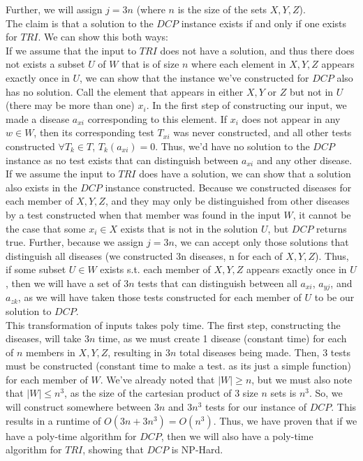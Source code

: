 \documentclass[letterpaper,notitlepage,twoside]{article}
\begin{document}
Further, we will assign $j=3n$ (where $n$ is the size of the sets $X, Y, Z$). \\
The claim is that a solution to the $DCP$ instance exists if and only if one exists for $TRI$. We can show this both ways: \\
If we assume that the input to $TRI$ does not have a solution, and thus there does not exists a subset $U$ of $W$ that is of size $n$ where each element in $X, Y, Z$ appears exactly once in $U$, we can show that the instance we've constructed for $DCP$ also has no solution. Call the element that appears in either $X, Y$ or $Z$ but not in $U$ (there may be more than one) $x_i$. In the first step of constructing our input, we made a disease $a_{xi}$ corresponding to this element. If $x_i$ does not appear in any $w \in W$, then its corresponding test $T_{xi}$ was never constructed, and all other tests constructed $\forall T_k \in T$, $T_k(a_{xi}) = 0$. Thus, we'd have no solution to the $DCP$ instance as no test exists that can distinguish between $a_{xi}$ and any other disease. \\
If we assume the input to $TRI$ does have a solution, we can show that a solution also exists in the $DCP$ instance constructed. Because we constructed diseases for each member of $X, Y, Z$, and they may only be distinguished from other diseases by a test constructed when that member was found in the input $W$, it cannot be the case that some $x_i \in X$ exists that is not in the solution $U$, but $DCP$ returns true. Further, because we assign $j=3n$, we can accept only those solutions that distinguish all diseases (we constructed 3n diseases, n for each of $X, Y, Z$). Thus, if some subset $U \in W$ exists s.t. each member of $X, Y, Z$ appears exactly once in $U$, then we will have a set of $3n$ tests that can distinguish between all $a_{xi}$, $a_{yj}$, and $a_{zk}$, as we will have taken those tests constructed for each member of $U$ to be our solution to $DCP$. \\
This transformation of inputs takes poly time. The first step, constructing the diseases, will take $3n$ time, as we must create 1 disease (constant time) for each of $n$ members in $X, Y, Z$, resulting in $3n$ total diseases being made. Then, 3 tests must be constructed (constant time to make a test. as its just a simple function) for each member of $W$. We've already noted that $|W| \geq n$, but we must also note that $|W| \leq n^3$, as the size of the cartesian product of 3 size $n$ sets is $n^3$. So, we will construct somewhere between $3n$ and $3n^3$ tests for our instance of $DCP$. This results in a runtime of $O(3n + 3n^3) = O(n^3)$. 
Thus, we have proven that if we have a poly-time algorithm for $DCP$, then we will also have a poly-time algorithm for $TRI$, showing that $DCP$ is NP-Hard. 
\end{document}
